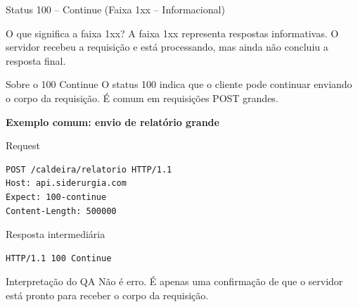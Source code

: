 \documentclass[9pt]{beamer}
\begin{document}
\begin{frame}[fragile]{Status 100 – Continue (Faixa 1xx – Informacional)}

\begin{block}{O que significa a faixa 1xx?}
A faixa 1xx representa respostas informativas.
O servidor recebeu a requisição e está processando,
mas ainda não concluiu a resposta final.
\end{block}

\begin{block}{Sobre o 100 Continue}
O status 100 indica que o cliente pode continuar enviando
o corpo da requisição. É comum em requisições POST grandes.
\end{block}

\textbf{Exemplo comum: envio de relatório grande}

\begin{block}{Request}
\begin{verbatim}
POST /caldeira/relatorio HTTP/1.1
Host: api.siderurgia.com
Expect: 100-continue
Content-Length: 500000
\end{verbatim}
\end{block}

\begin{block}{Resposta intermediária}
\begin{verbatim}
HTTP/1.1 100 Continue
\end{verbatim}
\end{block}

\begin{block}{Interpretação do QA}
Não é erro.
É apenas uma confirmação de que o servidor
está pronto para receber o corpo da requisição.
\end{block}

\end{frame}
\end{document}
